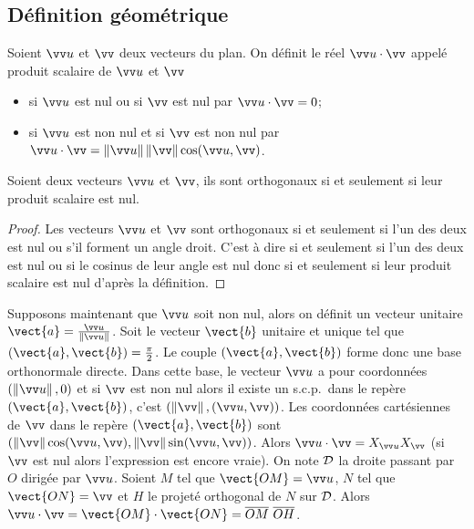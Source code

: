\subsection{Définition géométrique}
\begin{defdef}
  Soient $\vu$ et $\vv$ deux vecteurs du plan. On définit le réel $\vu \cdot \vv$ appelé produit scalaire de $\vu$ et $\vv$ 
  \begin{itemize}
  \item si $\vu$ est nul ou si $\vv$ est nul par $\vu \cdot \vv=0$;
  \item si $\vu$ est non nul et si $\vv$ est non nul par $\vu \cdot \vv=\norme{\vu}\norme{\vv}\cos(\vu, \vv)$.
  \end{itemize}
\end{defdef}
\begin{prop}
   Soient deux vecteurs $\vu$ et $\vv$, ils sont orthogonaux si et seulement si leur produit scalaire est nul.
\end{prop}
\begin{proof}
Les vecteurs $\vu$ et $\vv$ sont orthogonaux si et seulement si l'un des deux est nul ou s'il forment un angle droit. C'est à dire si et seulement si l'un des deux est nul ou si le cosinus de leur angle est nul donc si et seulement si leur produit scalaire est nul d'après la définition.
\end{proof}

Supposons maintenant que $\vu$ soit non nul, alors on définit un vecteur unitaire $\vect{a}=\frac{\vu}{\norme{\vu}}$. Soit le vecteur $\vect{b}$ unitaire et unique tel que $(\vect{a},\vect{b})=\frac{\pi}{2}$. Le couple $(\vect{a},\vect{b})$ forme donc une base orthonormale directe. Dans cette base, le vecteur $\vu$ a pour coordonnées $(\norme{\vu},0)$ et si $\vv$ est non nul alors il existe un s.c.p.\ dans le repère $(\vect{a},\vect{b})$, c'est $(\norme{\vv}, (\vu,\vv))$. Les coordonnées cartésiennes de $\vv$ dans le repère $(\vect{a},\vect{b})$ sont $(\norme{\vv}\cos(\vu,\vv),\norme{\vv}\sin(\vu,\vv))$. Alors $\vu \cdot \vv=X_{\vu}X_{\vv}$ (si $\vv$ est nul alors l'expression est encore vraie). On note $\mathcal{D}$ la droite passant par $O$ dirigée par $\vu$. Soient $M$ tel que $\vect{OM}=\vu$, $N$ tel que $\vect{ON}=\vv$ et $H$ le projeté orthogonal de $N$ sur $\mathcal{D}$. Alors $\vu \cdot \vv=\vect{OM} \cdot \vect{ON}= \overline{OM}~\overline{OH}$.

